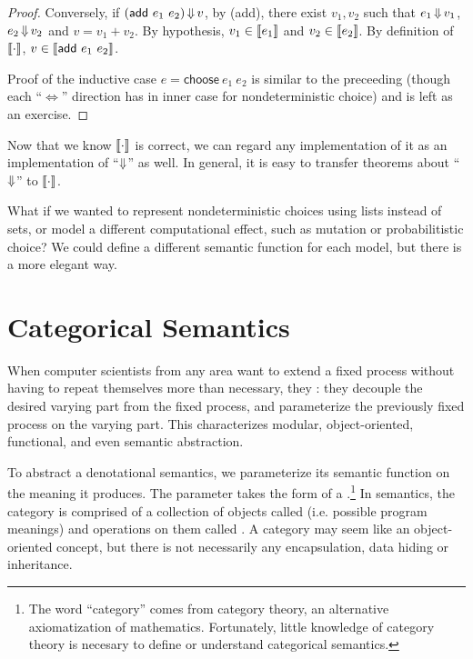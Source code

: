 {\begin{proof}
Conversely, if $(\mathsf{add}~e_1~e_2) \operatorname{\Downarrow} v$,
by (add), there exist $v_1,v_2$ such that $e_1 \operatorname{\Downarrow} v_1$, $e_2 \operatorname{\Downarrow} v_2$ and $v = v_1 + v_2$.
By hypothesis, $v_1 \in \left\llbracket{e_1}\right\rrbracket$ and $v_2 \in \left\llbracket{e_2}\right\rrbracket$.
By definition of $\left\llbracket{\cdot}\right\rrbracket$, $v \in \left\llbracket{\mathsf{add}~e_1~e_2}\right\rrbracket$.

Proof of the inductive case $e = \mathsf{choose}~e_1~e_2$ is similar to the preceeding (though each ``${\Longleftrightarrow}$'' direction has in inner case for nondeterministic choice) and is left as an exercise.
\end{proof}

Now that we know $\left\llbracket{\cdot}\right\rrbracket$ is correct, we can regard any implementation of it as an implementation of ``$\operatorname{\Downarrow}$''  as well.
In general, it is easy to transfer theorems about ``$\operatorname{\Downarrow}$'' to $\left\llbracket{\cdot}\right\rrbracket$.

What if we wanted to represent nondeterministic choices using lists instead of sets, or model a different computational effect, such as mutation or probabilitistic choice?
We could define a different semantic function for each model, but there is a more elegant way.


\section{Categorical Semantics}

When computer scientists from any area want to extend a fixed process without having to repeat themselves more than necessary, they : they decouple the desired varying part from the fixed process, and parameterize the previously fixed process on the varying part.
This characterizes modular, object-oriented, functional, and even semantic abstraction.

To abstract a denotational semantics, we parameterize its semantic function on the meaning it produces.
The parameter takes the form of a .\footnote{The word ``category'' comes from category theory, an alternative axiomatization of mathematics. Fortunately, little knowledge of category theory is necesary to define or understand categorical semantics.}
In semantics, the category is comprised of a collection of objects called  (i.e. possible program meanings) and operations on them called .
A category may seem like an object-oriented concept, but there is not necessarily any encapsulation, data hiding or inheritance.

}
